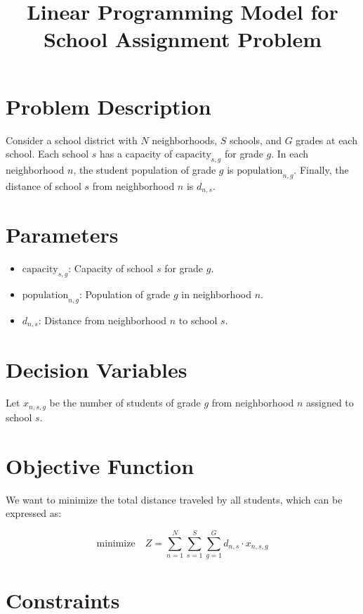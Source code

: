 \documentclass{article}
\begin{document}
\title{Linear Programming Model for School Assignment Problem}
\author{}
\date{}
\maketitle

\section*{Problem Description}

Consider a school district with \( N \) neighborhoods, \( S \) schools, and \( G \) grades at each school. Each school \( s \) has a capacity of \( \text{capacity}_{s,g} \) for grade \( g \). In each neighborhood \( n \), the student population of grade \( g \) is \( \text{population}_{n,g} \). Finally, the distance of school \( s \) from neighborhood \( n \) is \( d_{n,s} \).

\section*{Parameters}

\begin{itemize}
    \item \( \text{capacity}_{s,g} \): Capacity of school \( s \) for grade \( g \).
    \item \( \text{population}_{n,g} \): Population of grade \( g \) in neighborhood \( n \).
    \item \( d_{n,s} \): Distance from neighborhood \( n \) to school \( s \).
\end{itemize}

\section*{Decision Variables}

Let \( x_{n,s,g} \) be the number of students of grade \( g \) from neighborhood \( n \) assigned to school \( s \).

\section*{Objective Function}

We want to minimize the total distance traveled by all students, which can be expressed as:

\[
\text{minimize} \quad Z = \sum_{n=1}^{N} \sum_{s=1}^{S} \sum_{g=1}^{G} d_{n,s} \cdot x_{n,s,g}
\]

\section*{Constraints}
\end{document}
